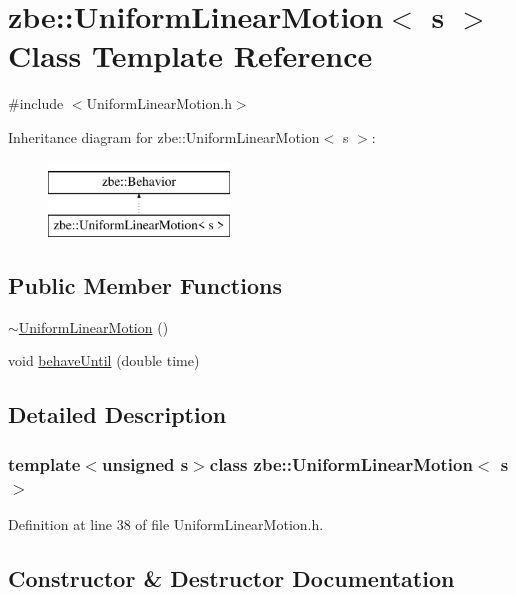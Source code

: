 \hypertarget{classzbe_1_1_uniform_linear_motion}{}\section{zbe\+:\+:Uniform\+Linear\+Motion$<$ s $>$ Class Template Reference}
\label{classzbe_1_1_uniform_linear_motion}


{\ttfamily \#include $<$Uniform\+Linear\+Motion.\+h$>$}

Inheritance diagram for zbe\+:\+:Uniform\+Linear\+Motion$<$ s $>$\+:\begin{figure}[H]
\begin{center}
\leavevmode
\includegraphics[height=2.000000cm]{classzbe_1_1_uniform_linear_motion}
\end{center}
\end{figure}
\subsection*{Public Member Functions}
\begin{DoxyCompactItemize}
\item 
\hyperlink{classzbe_1_1_uniform_linear_motion_a29ff82f8b26055cabe5fec9f8af02186}{$\sim$\+Uniform\+Linear\+Motion} ()
\item 
void \hyperlink{classzbe_1_1_uniform_linear_motion_a42678dd6e10f13645574f5e41611de82}{behave\+Until} (double time)
\end{DoxyCompactItemize}


\subsection{Detailed Description}
\subsubsection*{template$<$unsigned s$>$class zbe\+::\+Uniform\+Linear\+Motion$<$ s $>$}



Definition at line 38 of file Uniform\+Linear\+Motion.\+h.



\subsection{Constructor \& Destructor Documentation}
\hypertarget{classzbe_1_1_uniform_linear_motion_a29ff82f8b26055cabe5fec9f8af02186}{}
